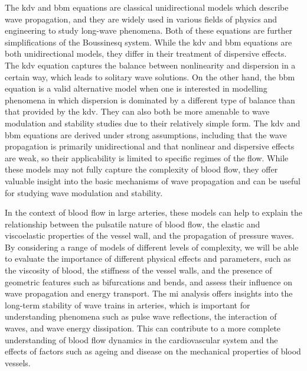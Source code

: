 \documentclass[alpha-refs, 12pt]{wiley-article}
\begin{document}
The \acrfull{kdv} and \acrfull{bbm} equations are classical unidirectional models which describe wave propagation, and they are widely used in various fields of physics and engineering to study long-wave phenomena. Both of these equations are further simplifications of the Boussinesq system. While the \acrshort{kdv} and \acrshort{bbm} equations are both unidirectional models, they differ in their treatment of dispersive effects. The \acrshort{kdv} equation captures the balance between nonlinearity and dispersion in a certain way, which leads to solitary wave solutions. On the other hand, the \acrshort{bbm} equation is a valid alternative model when one is interested in modelling phenomena in which dispersion is dominated by a different type of balance than that provided by the \acrshort{kdv}. They can also both be more amenable to wave modulation and stability studies due to their relatively simple form. The \acrshort{kdv} and \acrshort{bbm} equations are derived under strong assumptions, including that the wave propagation is primarily unidirectional and that nonlinear and dispersive effects are weak, so their applicability is limited to specific regimes of the flow. While these models may not fully capture the complexity of blood flow, they offer valuable insight into the basic mechanisms of wave propagation and can be useful for studying wave modulation and stability.

In the context of blood flow in large arteries, these models can help to explain the relationship between the pulsatile nature of blood flow, the elastic and viscoelastic properties of the vessel wall, and the propagation of pressure waves. By considering a range of models of different levels of complexity, we will be able to evaluate the importance of different physical effects and parameters, such as the viscosity of blood, the stiffness of the vessel walls, and the presence of geometric features such as bifurcations and bends, and assess their influence on wave propagation and energy transport. The \acrshort{mi} analysis offers insights into the long-term stability of wave trains in arteries, which is important for understanding phenomena such as pulse wave reflections, the interaction of waves, and wave energy dissipation. This can contribute to a more complete understanding of blood flow dynamics in the cardiovascular system and the effects of factors such as ageing and disease on the mechanical properties of blood vessels.
\end{document}
